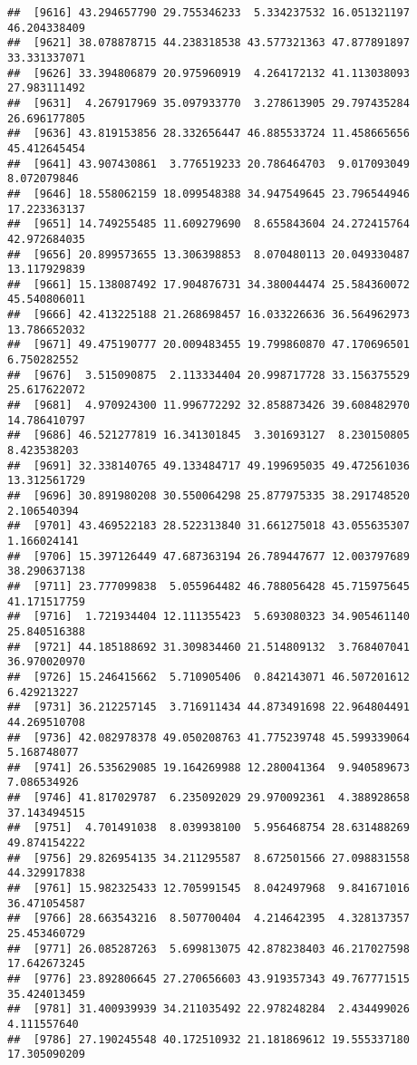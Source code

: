 \documentclass[
]{article}
\begin{document}
\begin{verbatim}
##  [9616] 43.294657790 29.755346233  5.334237532 16.051321197 46.204338409
##  [9621] 38.078878715 44.238318538 43.577321363 47.877891897 33.331337071
##  [9626] 33.394806879 20.975960919  4.264172132 41.113038093 27.983111492
##  [9631]  4.267917969 35.097933770  3.278613905 29.797435284 26.696177805
##  [9636] 43.819153856 28.332656447 46.885533724 11.458665656 45.412645454
##  [9641] 43.907430861  3.776519233 20.786464703  9.017093049  8.072079846
##  [9646] 18.558062159 18.099548388 34.947549645 23.796544946 17.223363137
##  [9651] 14.749255485 11.609279690  8.655843604 24.272415764 42.972684035
##  [9656] 20.899573655 13.306398853  8.070480113 20.049330487 13.117929839
##  [9661] 15.138087492 17.904876731 34.380044474 25.584360072 45.540806011
##  [9666] 42.413225188 21.268698457 16.033226636 36.564962973 13.786652032
##  [9671] 49.475190777 20.009483455 19.799860870 47.170696501  6.750282552
##  [9676]  3.515090875  2.113334404 20.998717728 33.156375529 25.617622072
##  [9681]  4.970924300 11.996772292 32.858873426 39.608482970 14.786410797
##  [9686] 46.521277819 16.341301845  3.301693127  8.230150805  8.423538203
##  [9691] 32.338140765 49.133484717 49.199695035 49.472561036 13.312561729
##  [9696] 30.891980208 30.550064298 25.877975335 38.291748520  2.106540394
##  [9701] 43.469522183 28.522313840 31.661275018 43.055635307  1.166024141
##  [9706] 15.397126449 47.687363194 26.789447677 12.003797689 38.290637138
##  [9711] 23.777099838  5.055964482 46.788056428 45.715975645 41.171517759
##  [9716]  1.721934404 12.111355423  5.693080323 34.905461140 25.840516388
##  [9721] 44.185188692 31.309834460 21.514809132  3.768407041 36.970020970
##  [9726] 15.246415662  5.710905406  0.842143071 46.507201612  6.429213227
##  [9731] 36.212257145  3.716911434 44.873491698 22.964804491 44.269510708
##  [9736] 42.082978378 49.050208763 41.775239748 45.599339064  5.168748077
##  [9741] 26.535629085 19.164269988 12.280041364  9.940589673  7.086534926
##  [9746] 41.817029787  6.235092029 29.970092361  4.388928658 37.143494515
##  [9751]  4.701491038  8.039938100  5.956468754 28.631488269 49.874154222
##  [9756] 29.826954135 34.211295587  8.672501566 27.098831558 44.329917838
##  [9761] 15.982325433 12.705991545  8.042497968  9.841671016 36.471054587
##  [9766] 28.663543216  8.507700404  4.214642395  4.328137357 25.453460729
##  [9771] 26.085287263  5.699813075 42.878238403 46.217027598 17.642673245
##  [9776] 23.892806645 27.270656603 43.919357343 49.767771515 35.424013459
##  [9781] 31.400939939 34.211035492 22.978248284  2.434499026  4.111557640
##  [9786] 27.190245548 40.172510932 21.181869612 19.555337180 17.305090209

\end{verbatim}
\end{document}
